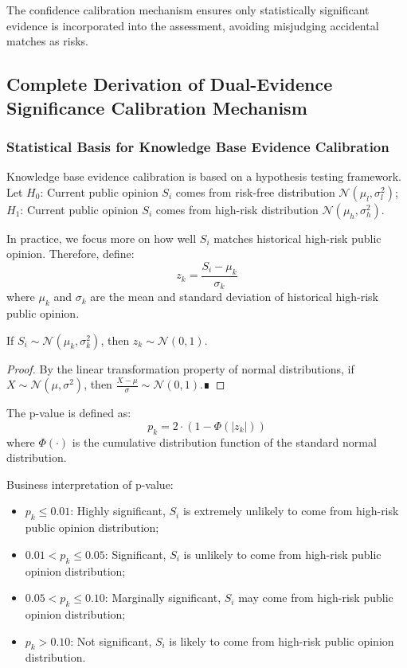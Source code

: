 \documentclass[11pt,a4paper]{report}
\newcommand{\Phi}{\varPhi}
\begin{document}
The confidence calibration mechanism ensures only statistically significant evidence is incorporated into the assessment, avoiding misjudging accidental matches as risks.

\subsection{Complete Derivation of Dual-Evidence Significance Calibration Mechanism}

\subsubsection{Statistical Basis for Knowledge Base Evidence Calibration}

Knowledge base evidence calibration is based on a hypothesis testing framework. Let $H_0$: Current public opinion $S_i$ comes from risk-free distribution $\mathcal{N}(\mu_l, \sigma_l^2)$; $H_1$: Current public opinion $S_i$ comes from high-risk distribution $\mathcal{N}(\mu_h, \sigma_h^2)$.

In practice, we focus more on how well $S_i$ matches historical high-risk public opinion. Therefore, define:
\[
z_k = \frac{S_i - \mu_k}{\sigma_k}
\]
where $\mu_k$ and $\sigma_k$ are the mean and standard deviation of historical high-risk public opinion.

\begin{theorem}
If $S_i \sim \mathcal{N}(\mu_k, \sigma_k^2)$, then $z_k \sim \mathcal{N}(0,1)$.
\end{theorem}

\begin{proof}
By the linear transformation property of normal distributions, if $X \sim \mathcal{N}(\mu, \sigma^2)$, then $\frac{X-\mu}{\sigma} \sim \mathcal{N}(0,1)$.∎
\end{proof}

The p-value is defined as:
\[
p_k = 2 \cdot (1 - \Phi(|z_k|))
\]
where $\Phi(\cdot)$ is the cumulative distribution function of the standard normal distribution.

Business interpretation of p-value:
\begin{itemize}
    \item $p_k \leq 0.01$: Highly significant, $S_i$ is extremely unlikely to come from high-risk public opinion distribution;
    \item $0.01 < p_k \leq 0.05$: Significant, $S_i$ is unlikely to come from high-risk public opinion distribution;
    \item $0.05 < p_k \leq 0.10$: Marginally significant, $S_i$ may come from high-risk public opinion distribution;
    \item $p_k > 0.10$: Not significant, $S_i$ is likely to come from high-risk public opinion distribution.
\end{itemize}
\end{document}
